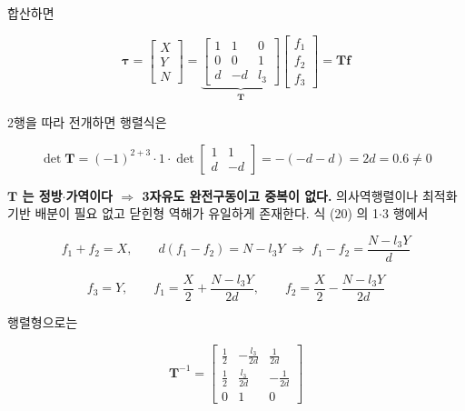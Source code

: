 \documentclass[10pt,a4paper]{article}
\begin{document}
합산하면

\begin{equation*}
\boldsymbol{\tau} =
\begin{bmatrix} X \\ Y \\ N \end{bmatrix}
= \underbrace{\begin{bmatrix}
1 & 1 & 0 \\
0 & 0 & 1 \\
d & -d & l_3
\end{bmatrix}}_{\mathbf{T}}
\begin{bmatrix} f_1 \\ f_2 \\ f_3 \end{bmatrix}
= \mathbf{T}\mathbf{f} \tag{20}
\end{equation*}

2행을 따라 전개하면 행렬식은

\begin{equation*}
\det\mathbf{T} = (-1)^{2+3}\cdot 1 \cdot
\det\!\begin{bmatrix} 1 & 1 \\ d & -d \end{bmatrix}
= -(-d - d) = 2d = 0.6 \neq 0 \tag{21}
\end{equation*}

\textbf{$\mathbf{T}$ 는 정방$\cdot$가역이다 $\Rightarrow$ 3자유도 완전구동이고 중복이 없다.} 의사역행렬이나 최적화 기반 배분이 필요 없고 닫힌형 역해가 유일하게 존재한다. 식 (20) 의 1$\cdot$3 행에서

\begin{equation*}
f_1 + f_2 = X, \qquad d(f_1 - f_2) = N - l_3 Y
\;\Longrightarrow\;
f_1 - f_2 = \frac{N - l_3 Y}{d} \tag{22}
\end{equation*}

\begin{equation*}
\boxed{\;
f_3 = Y, \qquad
f_1 = \frac{X}{2} + \frac{N - l_3 Y}{2d}, \qquad
f_2 = \frac{X}{2} - \frac{N - l_3 Y}{2d}
\;} \tag{23}
\end{equation*}

행렬형으로는

\begin{equation*}
\mathbf{T}^{-1} = \begin{bmatrix}
\tfrac12 & -\tfrac{l_3}{2d} & \tfrac{1}{2d} \\[4pt]
\tfrac12 & \tfrac{l_3}{2d} & -\tfrac{1}{2d} \\[4pt]
0 & 1 & 0
\end{bmatrix} \tag{24}
\end{equation*}
\end{document}
